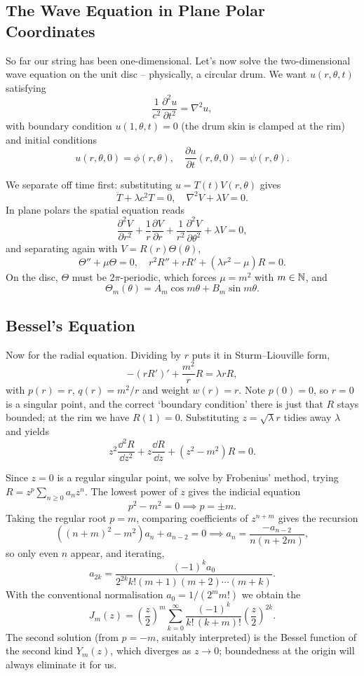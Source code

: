 \documentclass[a4paper]{scrartcl}
\begin{document}
\subsection{The Wave Equation in Plane Polar Coordinates}

So far our string has been one-dimensional. Let's now solve the two-dimensional wave equation on the unit disc -- physically, a circular drum. We want $u(r, \theta, t)$ satisfying
$$
\frac{1}{c^2} \frac{\partial^2 u}{\partial t^2} = \nabla^2 u,
$$
with boundary condition $u(1, \theta, t) = 0$ (the drum skin is clamped at the rim) and initial conditions
$$
u(r, \theta, 0) = \phi(r, \theta), \quad \frac{\partial u}{\partial t}(r, \theta, 0) = \psi(r, \theta).
$$

We separate off time first: substituting $u = T(t) V(r, \theta)$ gives
$$
\ddot{T} + \lambda c^2 T = 0, \quad \nabla^2 V + \lambda V = 0.
$$
In plane polars the spatial equation reads
$$
\frac{\partial^2 V}{\partial r^2} + \frac{1}{r}\frac{\partial V}{\partial r} + \frac{1}{r^2} \frac{\partial^2 V}{\partial \theta^2} + \lambda V = 0,
$$
and separating again with $V = R(r) \Theta(\theta)$,
$$
\Theta'' + \mu \Theta = 0, \quad r^2 R'' + r R' + (\lambda r^2 - \mu) R = 0.
$$
On the disc, $\Theta$ must be $2\pi$-periodic, which forces $\mu = m^2$ with $m \in \mathbb{N}$, and
$$
\Theta_m(\theta) = A_m \cos m \theta + B_m \sin m \theta.
$$

\subsection{Bessel's Equation}

Now for the radial equation. Dividing by $r$ puts it in Sturm--Liouville form,
$$
-\left(r R'\right)' + \frac{m^2}{r} R = \lambda r R,
$$
with $p(r) = r$, $q(r) = m^2/r$ and weight $w(r) = r$. Note $p(0) = 0$, so $r = 0$ is a singular point, and the correct `boundary condition' there is just that $R$ stays bounded; at the rim we have $R(1) = 0$. Substituting $z = \sqrt{\lambda} r$ tidies away $\lambda$ and yields 
$$
z^2 \frac{\dd^2 R}{\dd z^2} + z \frac{\dd R}{\dd z} + (z^2 - m^2) R = 0.
$$

Since $z = 0$ is a regular singular point, we solve by Frobenius' method, trying $R = z^p \sum_{n \geq 0} a_n z^n$. The lowest power of $z$ gives the indicial equation
$$
p^2 - m^2 = 0 \implies p = \pm m.
$$
Taking the regular root $p = m$, comparing coefficients of $z^{n + m}$ gives the recursion
$$
\left((n + m)^2 - m^2\right) a_n + a_{n - 2} = 0 \implies a_n = \frac{-a_{n - 2}}{n (n + 2m)},
$$
so only even $n$ appear, and iterating,
$$
a_{2k} = \frac{(-1)^k a_0}{2^{2k} k! (m + 1)(m+2)\cdots(m + k)}.
$$
With the conventional normalisation $a_0 = 1/(2^m m!)$ we obtain the 
$$
J_m(z) = \left(\frac{z}{2}\right)^m \sum_{k = 0}^{\infty} \frac{(-1)^k}{k! \, (k + m)!} \left(\frac{z}{2}\right)^{2k}.
$$
The second solution (from $p = -m$, suitably interpreted) is the Bessel function of the second kind $Y_m(z)$, which diverges as $z \rightarrow 0$; boundedness at the origin will always eliminate it for us.
\end{document}
